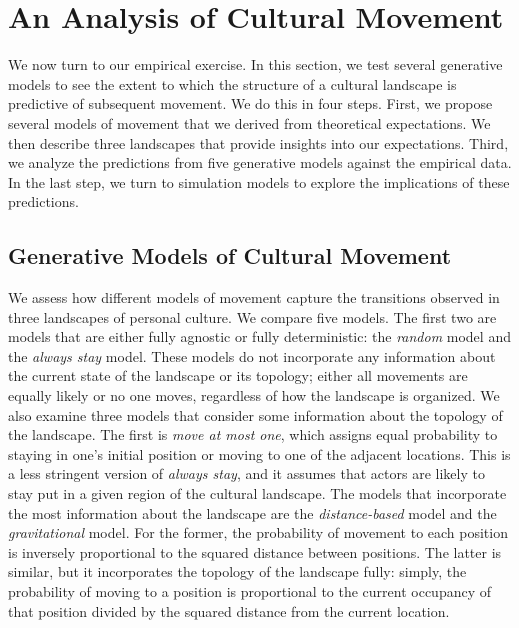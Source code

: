 \documentclass[
  11pt,
]{article}
\begin{document}
\hypertarget{an-analysis-of-cultural-movement}{%
\section{An Analysis of Cultural
Movement}\label{an-analysis-of-cultural-movement}}

We now turn to our empirical exercise. In this section, we test several
generative models to see the extent to which the structure of a cultural
landscape is predictive of subsequent movement. We do this in four
steps. First, we propose several models of movement that we derived from
theoretical expectations. We then describe three landscapes that provide
insights into our expectations. Third, we analyze the predictions from
five generative models against the empirical data. In the last step, we
turn to simulation models to explore the implications of these
predictions.

\hypertarget{generative-models-of-cultural-movement}{%
\subsection{Generative Models of Cultural
Movement}\label{generative-models-of-cultural-movement}}

We assess how different models of movement capture the transitions
observed in three landscapes of personal culture. We compare five
models. The first two are models that are either fully agnostic or fully
deterministic: the \emph{random} model and the \emph{always stay} model.
These models do not incorporate any information about the current state
of the landscape or its topology; either all movements are equally
likely or no one moves, regardless of how the landscape is organized. We
also examine three models that consider some information about the
topology of the landscape. The first is \emph{move at most one}, which
assigns equal probability to staying in one's initial position or moving
to one of the adjacent locations. This is a less stringent version of
\emph{always stay}, and it assumes that actors are likely to stay put in
a given region of the cultural landscape. The models that incorporate
the most information about the landscape are the \emph{distance-based}
model and the \emph{gravitational} model. For the former, the
probability of movement to each position is inversely proportional to
the squared distance between positions. The latter is similar, but it
incorporates the topology of the landscape fully: simply, the
probability of moving to a position is proportional to the current
occupancy of that position divided by the squared distance from the
current location.
\end{document}
